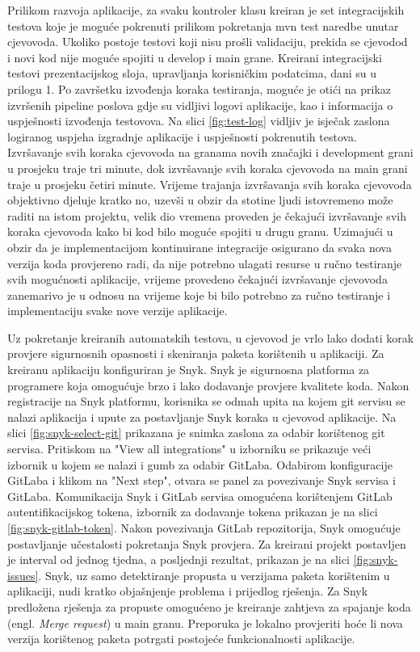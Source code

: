 \documentclass[a4paper,12pt,oneside]{article}
\begin{document}
Prilikom razvoja aplikacije, za svaku kontroler klasu kreiran je set integracijskih testova koje je moguće pokrenuti prilikom pokretanja mvn test naredbe unutar cjevovoda. Ukoliko postoje testovi koji nisu prošli validaciju, prekida se cjevodod i novi kod nije moguće spojiti u develop i main grane. Kreirani integracijski testovi prezentacijskog sloja, upravljanja korisničkim podatcima, dani su u prilogu 1. Po završetku izvođenja koraka testiranja, moguće je otići na prikaz izvršenih pipeline poslova gdje su vidljivi logovi aplikacije, kao i informacija o uspješnosti izvođenja testovova. Na slici \ref{fig:test-log} vidljiv je isječak zaslona logiranog uspjeha izgradnje aplikacije i uspješnosti pokrenutih testova. Izvršavanje svih koraka cjevovoda na granama novih značajki i development grani u prosjeku traje tri minute, dok izvršavanje svih koraka cjevovoda na main grani traje u prosjeku četiri minute. Vrijeme trajanja izvršavanja svih koraka cjevovoda objektivno djeluje kratko no, uzevši u obzir da stotine ljudi istovremeno može raditi na istom projektu, velik dio vremena proveden je čekajući izvršavanje svih koraka cjevovoda kako bi kod bilo moguće spojiti u drugu granu. Uzimajući u obzir da je implementacijom kontinuirane integracije osigurano da svaka nova verzija koda provjereno radi, da nije potrebno ulagati resurse u ručno testiranje svih mogućnosti aplikacije, vrijeme provedeno čekajući izvršavanje cjevovoda zanemarivo je u odnosu na vrijeme koje bi bilo potrebno za ručno testiranje i implementaciju svake nove verzije aplikacije. 

Uz pokretanje kreiranih automatskih testova, u cjevovod je vrlo lako dodati korak provjere sigurnosnih opasnosti i skeniranja paketa korištenih u aplikaciji. Za kreiranu aplikaciju konfiguriran je Snyk. Snyk je sigurnosna platforma za programere koja omogućuje brzo i lako dodavanje provjere kvalitete koda. Nakon registracije na Snyk platformu, korisnika se odmah upita na kojem git servisu se nalazi aplikacija i upute za postavljanje Snyk koraka u cjevovod aplikacije. Na slici \ref{fig:snyk-select-git} prikazana je snimka zaslona za odabir korištenog git servisa. Pritiskom na "View all integrations" u izborniku se prikazuje veći izbornik u kojem se nalazi i gumb za odabir GitLaba. Odabirom konfiguracije GitLaba i klikom na "Next step", otvara se panel za povezivanje Snyk servisa i GitLaba. Komunikacija Snyk i GitLab servisa omogućena korištenjem GitLab autentifikacijskog tokena, izbornik za dodavanje tokena prikazan je na slici \ref{fig:snyk-gitlab-token}. Nakon povezivanja GitLab repozitorija, Snyk omogućuje postavljanje učestalosti pokretanja Snyk provjera. Za kreirani projekt postavljen je interval od jednog tjedna, a posljednji rezultat, prikazan je na slici \ref{fig:snyk-issues}. Snyk, uz samo detektiranje propusta u verzijama paketa korištenim u aplikaciji, nudi kratko objašnjenje problema i prijedlog rješenja. Za Snyk predložena rješenja za propuste omogućeno je kreiranje zahtjeva za spajanje koda (engl. \textit{Merge request}) u main granu. Preporuka je lokalno provjeriti hoće li nova verzija korištenog paketa potrgati postojeće funkcionalnosti aplikacije.
\end{document}
